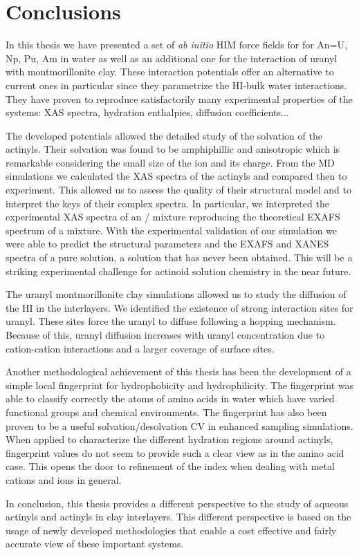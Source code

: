 \chapter[Conclusions]{Conclusions}\label{c5:conclusion}
In this thesis we have presented a set of \textit{ab initio} HIM force fields for 
 for An=U, Np, Pu, Am in water as well as an additional one for the 
interaction 
of 
uranyl with montmorillonite clay. These interaction potentials offer an alternative to current 
ones in particular since they pa\-ra\-me\-tri\-ze the HI-bulk water interactions. They have 
proven to reproduce satisfactorily many experimental properties of the systems: XAS spectra, 
hydration enthalpies, diffusion coefficients...

The developed potentials allowed the detailed study of the solvation of the actinyls. Their 
solvation 
was found to be amphiphillic and anisotropic which is remarkable considering the small size of the 
ion 
and its charge. From the MD simulations we calculated the XAS spectra of the 
actinyls and compared then to experiment. This allowed us to assess the quality of their structural 
model and to interpret the keys of their complex spectra. In particular, we 
interpreted the experimental XAS spectra of an / mixture 
reproducing the 
theoretical EXAFS spectrum of a mixture. With the experimental validation of our 
simulation we were able to predict the structural parameters and the EXAFS and XANES spectra of a 
pure 
 solution, a solution that has never been obtained. This will be a 
striking experimental challenge for actinoid solution chemistry in the near future.

The uranyl montmorillonite clay simulations allowed us to study the diffusion of the HI in the 
interlayers. We identified the existence of strong interaction sites for uranyl. These sites force 
the uranyl to diffuse following a hopping mechanism. Because of this,
uranyl diffusion increases with uranyl concentration due to cation-cation interactions 
and a larger coverage of 
surface sites.

Another methodological achievement of this thesis has been the development of a simple local 
fingerprint for hydrophobicity and hydrophilicity. The fingerprint was able to classify 
correctly 
the atoms of amino acids in water which have varied functional groups and chemical 
environments. The fingerprint has also been proven to be a useful solvation/desolvation CV in 
enhanced sampling simulations. When applied to characterize the different hydration regions 
around actinyls, fingerprint values do not seem to provide such a clear view as in the amino 
acid case. This opens the door to refinement of the index when dealing with metal cations and 
ions in general.
 

In conclusion, this thesis provides a different perspective to the study of aqueous actinyls and 
actinyls in clay interlayers. This different perspective is based on the usage of newly developed 
methodologies that enable a cost effective and fairly accurate view of these important systems. 
